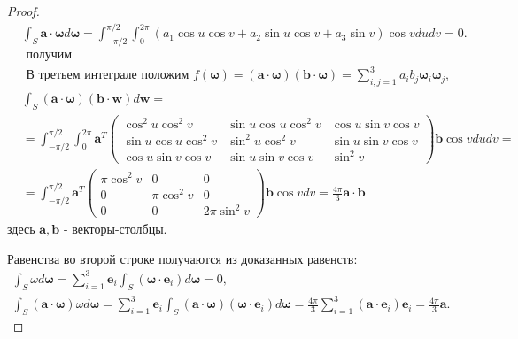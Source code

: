 \begin{proof}
\[
    \begin{aligned}
        & \int_{S} \mathbf{a} \cdot \boldsymbol{\omega} d \boldsymbol{\omega}=
        \int_{-\pi / 2}^{\pi / 2}
        \int_{0}^{2 \pi}\left(a_{1} \cos u \cos v+
        a_{2} \sin u \cos v+a_{3} \sin v\right) \cos v d u d v=0. \\
        & \text { получим } \\
        & \text { В третьем интеграле положим }
        f(\boldsymbol{\omega})=(\mathbf{a} \cdot \boldsymbol{\omega})(\mathbf{b}
        \cdot \boldsymbol{\omega})=\sum_{i, j=1}^{3} a_{i} b_{j}
        \boldsymbol{\omega}_{i} \boldsymbol{\omega}_{j} \text {, } \\
        & \int_{S}(\mathbf{a} \cdot \boldsymbol{\omega})(\mathbf{b}
        \cdot \boldsymbol{w}) d \boldsymbol{w}= \\
        & =\int_{-\pi / 2}^{\pi / 2} \int_{0}^{2 \pi}
        \mathbf{a}^{T}\left(\begin{array}{ccc}
                                \cos ^{2} u \cos ^{2} v & \sin u \cos u \cos ^{2} v
                                & \cos u \sin v \cos v \\\sin u \cos u \cos ^{2} v
                                & \sin ^{2} u \cos ^{2} v
                                & \sin u \sin v \cos v \\\cos u \sin v \cos v
                                & \sin u \sin v \cos v & \sin ^{2} v
        \end{array}\right) \mathbf{b} \cos v d u d v= \\
        & =\int_{-\pi / 2}^{\pi / 2} \mathbf{a}^{T}\left(
        \begin{array}{ccc}
            \pi \cos ^{2} v & 0 & 0 \\0 & \pi \cos ^{2} v & 0 \\0 & 0 & 2 \pi \sin ^{2} v
        \end{array}\right) \mathbf{b} \cos v d v=\frac{4 \pi}{3} \mathbf{a} \cdot \mathbf{b}
    \end{aligned}
\]
здесь $\mathbf{a}, \mathbf{b}$ - векторы-столбцы.


Равенства во второй строке получаются из доказанных равенств:
\[
    \begin{gathered}
        \int_{S} \omega d \boldsymbol{\omega}=\sum_{i=1}^{3} \mathbf{e}_{i}
        \int_{S}\left(\boldsymbol{\omega}
        \cdot \mathbf{e}_{i}\right) d \boldsymbol{\omega}=0, \\
        \int_{S}(\mathbf{a} \cdot \boldsymbol{\omega}) \omega d
        \boldsymbol{\omega}=\sum_{i=1}^{3} \mathbf{e}_{i}
        \int_{S}(\mathbf{a} \cdot \boldsymbol{\omega})\left(\boldsymbol{\omega}
        \cdot \mathbf{e}_{i}\right) d
        \boldsymbol{\omega}=\frac{4 \pi}{3} \sum_{i=1}^{3}\left(\mathbf{a}
        \cdot \mathbf{e}_{i}\right)
        \mathbf{e}_{i}=\frac{4 \pi}{3} \mathbf{a}.
    \end{gathered}
\]



\end{proof}
